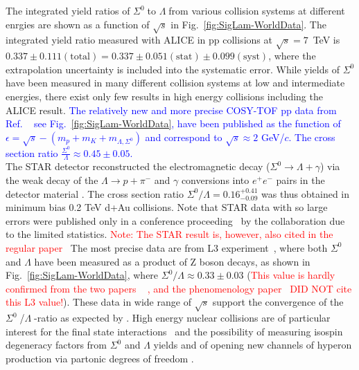 \documentclass[ALICE,manyauthors]{cernphprep}
\newcommand{\sig}{\ensuremath{\Sigma^0  \; }}
\newcommand{\lam}{\ensuremath{\Lambda \; }}
\newcommand{\red}{\textcolor{red}}
\newcommand{\blue}{\textcolor{blue}}
\begin{document}
The integrated yield ratios of \sig to \lam from various collision systems at different enrgies are shown as a function
of $\sqrt{s}$ in Fig.~\ref{fig:SigLam-WorldData}. The integrated yield ratio measured with ALICE in pp collisions 
at $\sqrt{s} = 7$~TeV is $0.337  \pm 0.111(\mathrm{total}) = 0.337   \pm 0.051(\mathrm{stat}) 
\pm 0.099 (\mathrm{syst})$, where the extrapolation uncertainty is included into the systematic error. While yields 
of $\Sigma^0$ have been measured in many different collision systems at low and intermediate energies, there 
exist only few results in high energy collisions including the ALICE result. 
\blue{The relatively new and more precise COSY-TOF pp data  from Ref.
~\cite{cite:COSY-TOF,cite:Sigma0Phenomenology} see Fig.~\ref{fig:SigLam-WorldData}, have been 
published as the function of $\epsilon = \sqrt{s} -(m_p + m_K + m_{\Lambda,\Sigma^0})$ and correspond to
 $\sqrt{s} \approx 2 $ GeV/$c$. The cross section ratio $\frac{\Sigma^0}{\Lambda} \approx 0.45 \pm 0.05$.} \\
The STAR detector reconstructed the 
electromagnetic decay ($\Sigma^0 \to \Lambda + \gamma$) via the weak decay of the $\Lambda \to p + \pi^- $ and 
$\gamma$ conversions into $e^+ e^-$ pairs in the detector material \cite{cite:SigLamRatio-VanBuren,
 cite:Sigma0Phenomenology}. The cross section ratio $\Sigma^0/\Lambda = 0.16^{+0.41}_{-0.09}$ was thus obtained 
in minimum bias 0.2 TeV d+Au collisions. 
Note that STAR data with so large errors were published only in
a conference proceeding~\cite{cite:SigLamRatio-VanBuren} by the collaboration due to the limited statistics. 
\red{Note: The STAR result is, however, also cited in the regular paper~\cite{ cite:Sigma0Phenomenology}}
The most precise data are from L3 experiment~\cite{cite:L3, cite:L3_lambda}, where both $\Sigma^0$ and  $\Lambda$ have 
been measured as a product of Z boson decays, as shown in Fig.~\ref{fig:SigLam-WorldData}, where 
$\Sigma^0/\Lambda \approx 0.33 \pm 0.03$ (\red{This value is hardly confirmed from the two papers
~\cite{cite:L3, cite:L3_lambda} , and the phenomenology paper~\cite{ cite:Sigma0Phenomenology} DID NOT
cite this L3 value!}). These data in wide range of $\sqrt{s}$ support the convergence of the \sig/\lam-ratio as expected by \cite{cite:Sigma0Phenomenology}. 
High energy nuclear collisions are of particular interest for the final state interactions~\cite{cite:Sigma0Phenomenology} 
and the possibility of measuring isospin degeneracy factors from $\Sigma^0$ and $\Lambda$ yields and 
of opening new channels of hyperon production via partonic degrees of freedom \cite{cite:KochRafel-TimeEvolution}.
\end{document}
